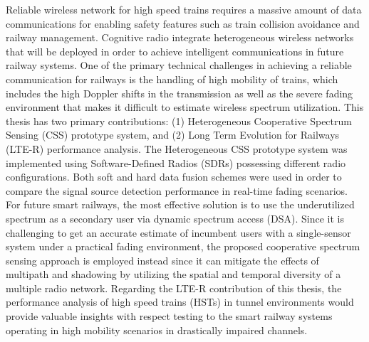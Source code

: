 Reliable wireless network for high speed trains requires a massive amount of data communications for enabling safety features such as train collision avoidance and railway management. Cognitive radio integrate heterogeneous wireless networks that will be deployed in order to achieve intelligent communications in future railway systems. One of the primary technical challenges in achieving a reliable communication for railways is the handling of high mobility of trains, which includes the high Doppler shifts in the transmission as well as the severe fading environment that makes it difficult to estimate wireless spectrum utilization. This thesis has two primary contributions: (1) Heterogeneous Cooperative Spectrum Sensing (CSS) prototype system, and (2) Long Term Evolution for Railways (LTE-R) performance analysis. The Heterogeneous CSS prototype system was implemented using Software-Defined Radios (SDRs) possessing different radio configurations. Both soft and hard data fusion schemes were used in order to compare the signal source detection performance in real-time fading scenarios. For future smart railways, the most effective solution is to use the underutilized spectrum as a secondary user via dynamic spectrum access (DSA). Since it is challenging to get an accurate estimate of incumbent users with a single-sensor system under a practical fading environment, the proposed cooperative spectrum sensing approach is employed instead since it can mitigate the effects of multipath and shadowing by utilizing the spatial and temporal diversity of a multiple radio network. Regarding the LTE-R contribution of this thesis, the performance analysis of high speed trains (HSTs) in tunnel environments would provide valuable insights with respect testing to the smart railway systems operating in high mobility scenarios in drastically impaired channels.


